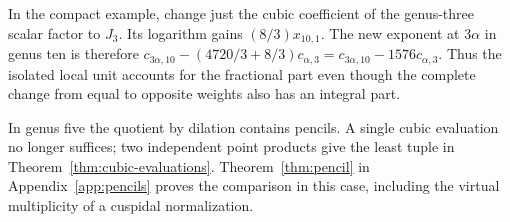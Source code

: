 In the compact example, change just the cubic coefficient of the
genus-three scalar factor to $J_3$.
Its logarithm gains $(8/3)x_{10,1}$. The new exponent at $3\alpha$
in genus ten is therefore $c_{3\alpha,10}-(4720/3+8/3)c_{\alpha,3}
=c_{3\alpha,10}-1576c_{\alpha,3}$. Thus the isolated local unit
accounts for the fractional part even though the complete change
from equal to opposite weights also has an integral part.

In genus five the quotient by dilation contains pencils. A single
cubic evaluation no longer suffices; two independent point products
give the least tuple in Theorem~\ref{thm:cubic-evaluations}. Theorem~\ref{thm:pencil}
in Appendix~\ref{app:pencils} proves the comparison in this case,
including the virtual multiplicity of a cuspidal normalization.
